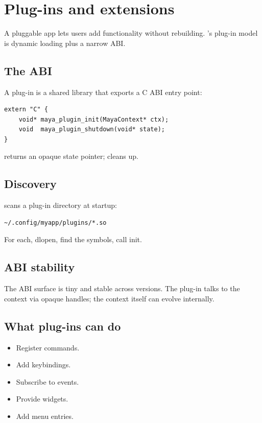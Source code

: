 \chapter{Plug-ins and extensions}
\label{ch:plugins}

\begin{aside}
A pluggable app lets users add functionality without
rebuilding. \maya{}'s plug-in model is dynamic loading plus a
narrow ABI.
\end{aside}

\section{The ABI}

A plug-in is a shared library that exports a C ABI entry
point:

\begin{lstlisting}
extern "C" {
    void* maya_plugin_init(MayaContext* ctx);
    void  maya_plugin_shutdown(void* state);
}
\end{lstlisting}

 returns an opaque state pointer; 
cleans up.

\section{Discovery}

\maya{} scans a plug-in directory at startup:

\begin{lstlisting}
~/.config/myapp/plugins/*.so
\end{lstlisting}

For each, dlopen, find the symbols, call init.

\section{ABI stability}

The ABI surface is tiny and stable across versions. The
plug-in talks to the context via opaque handles; the
context itself can evolve internally.

\section{What plug-ins can do}

\begin{itemize}[leftmargin=*]
  \item Register commands.
  \item Add keybindings.
  \item Subscribe to events.
  \item Provide widgets.
  \item Add menu entries.
\end{itemize}

